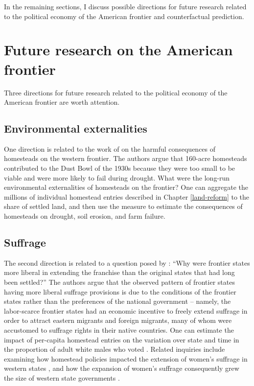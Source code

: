 In the remaining sections, I discuss possible directions for future research related to the political economy of the American frontier and counterfactual prediction. 

\section{Future research on the American frontier}

Three directions for future research related to the political economy of the American frontier are worth attention. 

\subsection{Environmental externalities} One direction is related to the work of \citet{hansen2001us} on the harmful consequences of homesteads on the western frontier. The authors argue that 160-acre homesteads contributed to the Dust Bowl of the 1930s because they were too small to be viable and were more likely to fail during drought. What were the long-run environmental externalities of homesteads on the frontier? One can aggregate the millions of individual homestead entries described in Chapter \ref{land-reform} to the share of settled land, and then use the measure to estimate the consequences of homesteads on drought, soil erosion, and farm failure. 

\subsection{Suffrage} The second direction is related to a question posed by \citet{engerman2005evolution}: ``Why were frontier states more liberal in extending the franchise than the original states that had long been settled?'' The authors argue that the observed pattern of frontier states having more liberal suffrage provisions is due to the conditions of the frontier states rather than the preferences of the national government -- namely, the labor-scarce frontier states had an economic incentive to freely extend suffrage in order to attract eastern migrants and foreign migrants, many of whom were accustomed to suffrage rights in their native countries. One can estimate the impact of per-capita homestead entries on the variation over state and time in the proportion of adult white males who voted \citep{mccormick1960new}. Related inquiries include examining how homestead policies impacted the extension of women's suffrage in western states \citep{teele2018west}, and how the expansion of women's suffrage consequently grew the size of western state governments \citep{lott1999did}.

